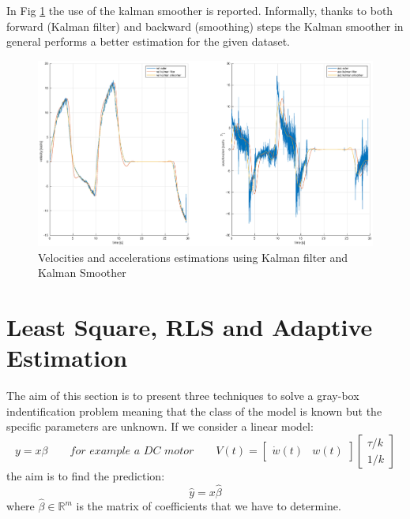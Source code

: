 \documentclass[a4paper,12pt]{article}
\begin{document}
In Fig \ref{fig:kalman_smoother} the use of the kalman smoother is reported. Informally, thanks to both forward (Kalman filter) and backward (smoothing) steps the Kalman smoother in general performs a better estimation for the given dataset.
\begin{figure}[H]
    \begin{center}
        \hspace*{-4.6cm}
        \includegraphics[scale=0.5]{images/kalman_smoother.eps}
    \end{center}
    \caption{Velocities and accelerations estimations using Kalman filter and Kalman Smoother}
    \label{fig:kalman_smoother}
\end{figure}
\section{Least Square, RLS and Adaptive Estimation}
The aim of this section is to present three techniques to solve a gray-box indentification problem meaning that the class of the model is known but the specific parameters are unknown. If we consider a linear model:
\[
    y = x\beta \qquad \textit{for example a DC motor} \qquad V(t) = \begin{bmatrix}
        \dot{w}(t) & w(t) 
    \end{bmatrix} \begin{bmatrix}
        \tau/k \\ 1/k
    \end{bmatrix}
\]
the aim is to find the prediction:
\[
    \hat{y} = x \hat{\beta}
\]
where $\hat{\beta} \in \mathbb{R}^m$ is the matrix of coefficients that we have to determine.
\end{document}
